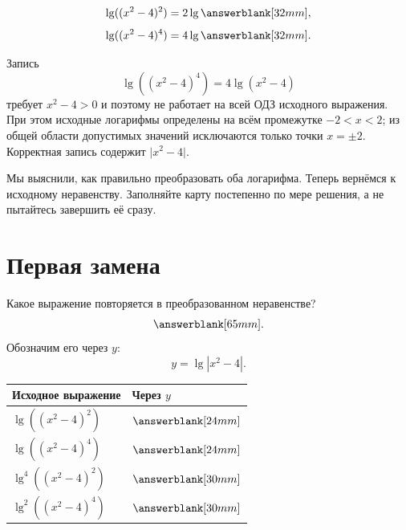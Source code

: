 
\begin{fillbox}
  \[
    \lg((x^2-4)^2)=2\lg\answerblank[32mm],
  \]
  \[
    \lg((x^2-4)^4)=4\lg\answerblank[32mm].
  \]
\end{fillbox}

\begin{warningbox}
  Запись
  \[
    \lg((x^2-4)^4)=4\lg(x^2-4)
  \]
  требует \(x^2-4>0\) и поэтому не работает на всей ОДЗ исходного выражения.
  При этом исходные логарифмы определены на всём промежутке \(-2<x<2\);
  из общей области допустимых значений исключаются только точки \(x=\pm2\).
  Корректная запись содержит \(\lvert x^2-4\rvert\).
\end{warningbox}

\begin{thinkbox}
  Мы выяснили, как правильно преобразовать оба логарифма. Теперь вернёмся к
  исходному неравенству. Заполняйте карту постепенно по мере решения, а не
  пытайтесь завершить её сразу.
  \logchainstudentfigure
\end{thinkbox}

\section{Первая замена}

Какое выражение повторяется в преобразованном неравенстве?
\[
  \answerblank[65mm].
\]
Обозначим его через \(y\):
\[
  y=\lg|x^2-4|.
\]

\begin{fillbox}
  \begin{center}
    \renewcommand{\arraystretch}{1.65}
    \begin{tabularx}{0.94\textwidth}{@{}
      >{\centering\arraybackslash}p{}
      >{\centering\arraybackslash}X@{}}
      \toprule
      \rowcolor{TableHeader}
      Исходное выражение & Через \(y\) \\
      \midrule
      \(\lg((x^2-4)^2)\) & \(\answerblank[24mm]\) \\
      \addlinespace[0.25em]
      \(\lg((x^2-4)^4)\) & \(\answerblank[24mm]\) \\
      \addlinespace[0.25em]
      \(\lg^4((x^2-4)^2)\) & \(\answerblank[30mm]\) \\
      \addlinespace[0.25em]
      \(\lg^2((x^2-4)^4)\) & \(\answerblank[30mm]\) \\
      \bottomrule
    \end{tabularx}
  \end{center}
\end{fillbox}

